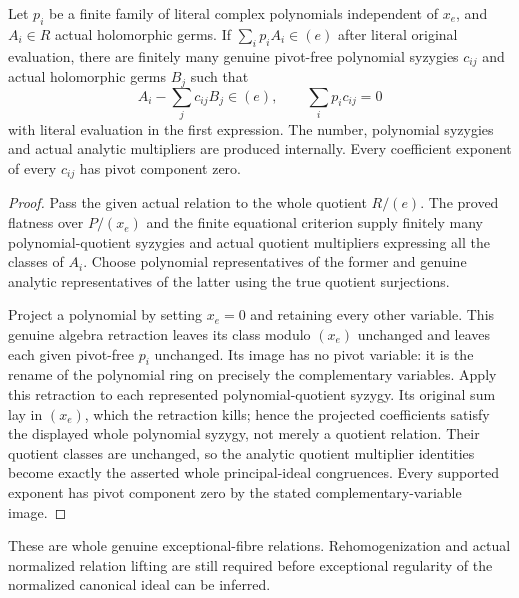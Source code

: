 \begin{theorem}
\label{hir:actual-original-exceptional-fibre-polynomial-syzygies}
\leanok
Let $p_i$ be a finite family of literal complex polynomials independent
of $x_e$, and $A_i\in R$ actual holomorphic germs. If
$\sum_i p_iA_i\in(e)$ after literal original evaluation, there are
finitely many genuine pivot-free polynomial syzygies $c_{ij}$ and
actual holomorphic germs $B_j$ such that
\[
 A_i-\sum_j c_{ij}B_j\in(e),\qquad
 \sum_i p_ic_{ij}=0
\]
with literal evaluation in the first expression. The number,
polynomial syzygies and actual analytic multipliers are produced
internally. Every coefficient exponent of every $c_{ij}$ has pivot
component zero.
\end{theorem}
\begin{proof}
Pass the given actual relation to the whole quotient $R/(e)$. The
proved flatness over $P/(x_e)$ and the finite equational criterion
supply finitely many polynomial-quotient syzygies and actual
quotient multipliers expressing all the classes of $A_i$.
Choose polynomial representatives of the former and genuine analytic
representatives of the latter using the true quotient surjections.

Project a polynomial by setting $x_e=0$ and retaining every other
variable. This genuine algebra retraction leaves its class modulo
$(x_e)$ unchanged and leaves each given pivot-free $p_i$ unchanged.
Its image has no pivot variable: it is the rename of the polynomial
ring on precisely the complementary variables. Apply this retraction
to each represented polynomial-quotient syzygy. Its original sum lay
in $(x_e)$, which the retraction kills; hence the projected coefficients
satisfy the displayed whole polynomial syzygy, not merely a quotient
relation. Their quotient classes are unchanged, so the analytic
quotient multiplier identities become exactly the asserted whole
principal-ideal congruences. Every supported exponent has pivot
component zero by the stated complementary-variable image.
\end{proof}

\begin{remark}
These are whole genuine exceptional-fibre relations. Rehomogenization
and actual normalized relation lifting are still required before
exceptional regularity of the normalized canonical ideal can be inferred.
\end{remark}

